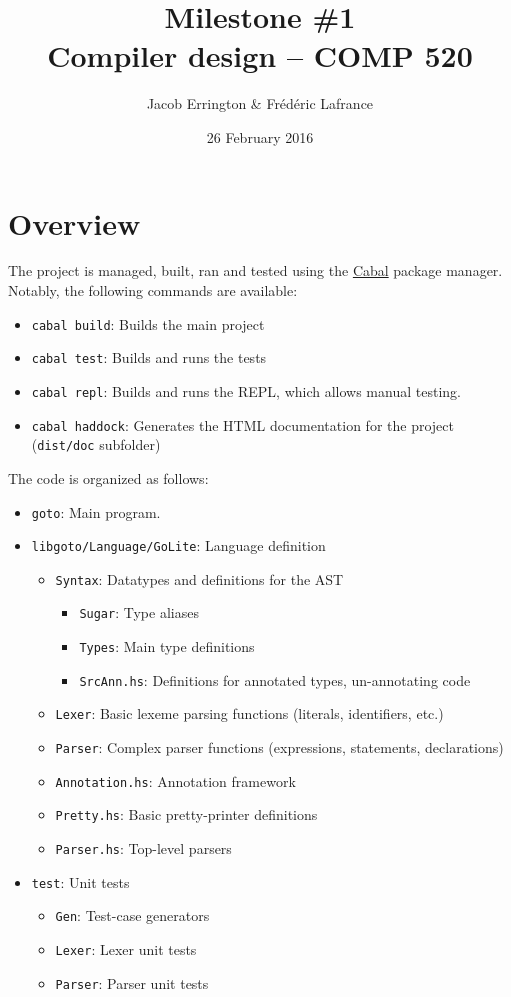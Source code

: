 \documentclass[letterpaper,11pt]{article}
\title{Milestone \#1\\Compiler design -- COMP 520}
\author{Jacob Errington \& Fr\'ed\'eric Lafrance}
\date{26 February 2016}
\begin{document}
\maketitle

\section{Overview}
The project is managed, built, ran and tested using the \href{https://www.haskell.org/cabal/}{Cabal} package manager. Notably, the following commands are available:
\begin{itemize}
\item\texttt{cabal build}: Builds the main project
\item\texttt{cabal test}: Builds and runs the tests
\item\texttt{cabal repl}: Builds and runs the REPL, which allows manual testing.
\item\texttt{cabal haddock}: Generates the HTML documentation for the project (\texttt{dist/doc} subfolder)
\end{itemize}
The code is organized as follows:
\begin{itemize}
\item \texttt{goto}: Main program.
\item \texttt{libgoto/Language/GoLite}: Language definition
	\begin{itemize}
	\item \texttt{Syntax}: Datatypes and definitions for the AST
			\begin{itemize}
			\item \texttt{Sugar}: Type aliases
			\item \texttt{Types}: Main type definitions
			\item \texttt{SrcAnn.hs}: Definitions for annotated types, un-annotating code
			\end{itemize}
	\item \texttt{Lexer}: Basic lexeme parsing functions (literals, identifiers, etc.)
	\item \texttt{Parser}: Complex parser functions (expressions, statements, declarations)
	
	\item \texttt{Annotation.hs}: Annotation framework
	\item \texttt{Pretty.hs}: Basic pretty-printer definitions
	\item \texttt{Parser.hs}: Top-level parsers
	
	\end{itemize}
\item \texttt{test}: Unit tests
	\begin{itemize}
	\item \texttt{Gen}: Test-case generators
	\item \texttt{Lexer}: Lexer unit tests
	\item \texttt{Parser}: Parser unit tests
	\end{itemize}

\end{itemize}
\end{document}
